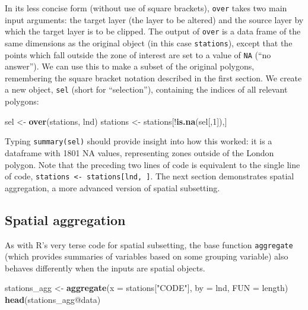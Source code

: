 \documentclass[]{article}
\newenvironment{Shaded}{}{}
\newcommand{\KeywordTok}[1]{\textcolor[rgb]{0.00,0.44,0.13}{\textbf{{#1}}}}
\newcommand{\DataTypeTok}[1]{\textcolor[rgb]{0.56,0.13,0.00}{{#1}}}
\newcommand{\DecValTok}[1]{\textcolor[rgb]{0.25,0.63,0.44}{{#1}}}
\newcommand{\StringTok}[1]{\textcolor[rgb]{0.25,0.44,0.63}{{#1}}}
\newcommand{\NormalTok}[1]{{#1}}
\begin{document}
In its less concise form (without use of square brackets), \texttt{over}
takes two main input arguments: the target layer (the layer to be
altered) and the source layer by which the target layer is to be
clipped. The output of \texttt{over} is a data frame of the same
dimensions as the original object (in this case \texttt{stations}),
except that the points which fall outside the zone of interest are set
to a value of \texttt{NA} (``no answer''). We can use this to make a
subset of the original polygons, remembering the square bracket notation
described in the first section. We create a new object, \texttt{sel}
(short for ``selection''), containing the indices of all relevant
polygons:

\begin{Shaded}
\begin{Highlighting}[]
\NormalTok{sel <-}\StringTok{ }\KeywordTok{over}\NormalTok{(stations, lnd)}
\NormalTok{stations <-}\StringTok{ }\NormalTok{stations[!}\KeywordTok{is.na}\NormalTok{(sel[,}\DecValTok{1}\NormalTok{]),]}
\end{Highlighting}
\end{Shaded}

Typing \texttt{summary(sel)} should provide insight into how this
worked: it is a dataframe with 1801 NA values, representing zones
outside of the London polygon. Note that the preceding two lines of code
is equivalent to the single line of code,
\texttt{stations \textless{}- stations{[}lnd, {]}}. The next section
demonstrates spatial aggregation, a more advanced version of spatial
subsetting.

\subsection{Spatial aggregation}\label{spatial-aggregation}

As with R's very terse code for spatial subsetting, the base function
\texttt{aggregate} (which provides summaries of variables based on some
grouping variable) also behaves differently when the inputs are spatial
objects.

\begin{Shaded}
\begin{Highlighting}[]
\NormalTok{stations_agg <-}\StringTok{ }\KeywordTok{aggregate}\NormalTok{(}\DataTypeTok{x =} \NormalTok{stations[}\StringTok{"CODE"}\NormalTok{], }\DataTypeTok{by =} \NormalTok{lnd, }\DataTypeTok{FUN =} \NormalTok{length)}
\KeywordTok{head}\NormalTok{(stations_agg@data)}
\end{Highlighting}
\end{Shaded}
\end{document}
